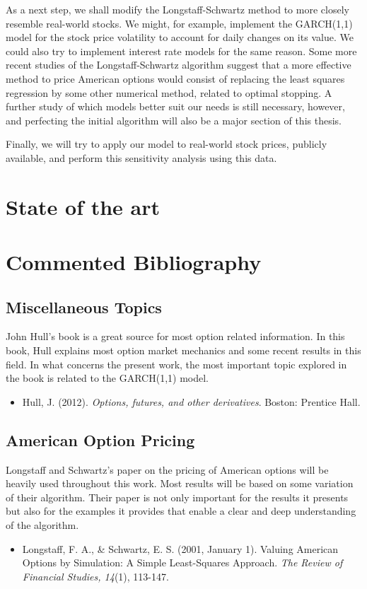 \documentclass[a4paper,prd,twocolumn,nofootinbib,superscriptaddress,floatfix]{revtex4}
\begin{document}
As a next step, we shall modify the Longstaff-Schwartz method to more closely resemble real-world stocks.
We might, for example, implement the GARCH(1,1) model for the stock price volatility to account for daily changes on its value. We could also try to implement interest rate models for the same reason.
Some more recent studies of the Longstaff-Schwartz algorithm suggest that a more effective method to price American options would consist of replacing the least squares regression by some other numerical method, related to optimal stopping.
A further study of which models better suit our needs is still necessary, however, and perfecting the initial algorithm will also be a major section of this thesis.


Finally, we will try to apply our model to real-world stock prices, publicly available, and perform this sensitivity analysis using this data.



\section{State of the art}


\section{Commented Bibliography}
\subsection{Miscellaneous Topics}
John Hull's book is a great source for most option related information. In this book, Hull explains most option market mechanics and some recent results in this field. In what concerns the present work, the most important topic explored in the book is related to the GARCH(1,1) model.
\begin{itemize}
\item Hull, J. (2012). \textit{Options, futures, and other derivatives}. Boston: Prentice Hall.
\end{itemize}

\subsection{American Option Pricing}
Longstaff and Schwartz's paper on the pricing of American options will be heavily used throughout this work. Most results will be based on some variation of their algorithm. Their paper is not only important for the results it presents but also for the examples it provides that enable a clear and deep understanding of the algorithm.
\begin{itemize}
\item Longstaff, F. A., \& Schwartz, E. S. (2001, January 1). Valuing American Options by Simulation: A Simple Least-Squares Approach. \textit{The Review of Financial Studies, 14}(1), 113-147.
\end{itemize}
\end{document}
